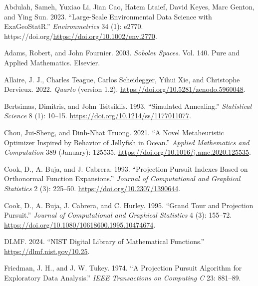 \documentclass[
  12pt,
]{interact}
\newlength{\cslhangindent}
\newlength{\cslentryspacingunit} %
\newenvironment{CSLReferences}[2] %
 {%
  \setlength{\parindent}{0pt}
  \ifodd #1
  \let\oldpar\par
  \def\par{\hangindent=\cslhangindent\oldpar}
  \fi
  \setlength{\parskip}{#2\cslentryspacingunit}
 }%
 {}
\theoremstyle{plain}
\begin{document}
\hypertarget{refs}{}
\begin{CSLReferences}{1}{0}
\leavevmode{}%
Abdulah, Sameh, Yuxiao Li, Jian Cao, Hatem Ltaief, David Keyes, Marc
Genton, and Ying Sun. 2023. {``Large-Scale Environmental Data Science
with {ExaGeoStatR}.''} \emph{Environmetrics} 34 (1): e2770.
https://doi.org/\url{https://doi.org/10.1002/env.2770}.

\leavevmode{}%
Adams, Robert, and John Fournier. 2003. \emph{Sobolev Spaces}. Vol. 140.
Pure and Applied Mathematics. Elsevier.

\leavevmode{}%
Allaire, J. J., Charles Teague, Carlos Scheidegger, Yihui Xie, and
Christophe Dervieux. 2022. \emph{{Quarto}} (version 1.2).
\url{https://doi.org/10.5281/zenodo.5960048}.

\leavevmode{}%
Bertsimas, Dimitris, and John Tsitsiklis. 1993. {``{Simulated
Annealing}.''} \emph{Statistical Science} 8 (1): 10--15.
\url{https://doi.org/10.1214/ss/1177011077}.

\leavevmode{}%
Chou, Jui-Sheng, and Dinh-Nhat Truong. 2021. {``A Novel Metaheuristic
Optimizer Inspired by Behavior of Jellyfish in Ocean.''} \emph{Applied
Mathematics and Computation} 389 (January): 125535.
\url{https://doi.org/10.1016/j.amc.2020.125535}.

\leavevmode{}%
Cook, D., A. Buja, and J. Cabrera. 1993. {``Projection Pursuit Indexes
Based on Orthonormal Function Expansions.''} \emph{Journal of
Computational and Graphical Statistics} 2 (3): 225--50.
\url{https://doi.org/10.2307/1390644}.

\leavevmode{}%
Cook, D., A. Buja, J. Cabrera, and C. Hurley. 1995. {``Grand Tour and
Projection Pursuit.''} \emph{Journal of Computational and Graphical
Statistics} 4 (3): 155--72.
\url{https://doi.org/10.1080/10618600.1995.10474674}.

\leavevmode{}%
DLMF. 2024. {``{NIST Digital Library of Mathematical Functions}.''}
\url{https://dlmf.nist.gov/10.25}.

\leavevmode{}%
Friedman, J. H., and J. W. Tukey. 1974. {``{A} {P}rojection {P}ursuit
{A}lgorithm for {E}xploratory {D}ata {A}nalysis.''} \emph{IEEE
Transactions on Computing C} 23: 881--89.


\end{CSLReferences}
\end{document}
